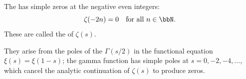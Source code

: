 \begin{corollary} \label{corollary:trivial_zeros_of_riemann_zeta_function}
The  has simple zeros at the negative even integers:
$$
\zeta(-2n) = 0 \quad \text{for all } n \in \bbN.
$$
These are called the  of $\zeta(s)$.

They arise from the poles of the  $\Gamma(s/2)$ in the functional equation $\xi(s) = \xi(1-s)$; the gamma function has simple poles at $s = 0, -2, -4, \dots$, which cancel the analytic continuation of $\zeta(s)$ to produce zeros.
\end{corollary}
